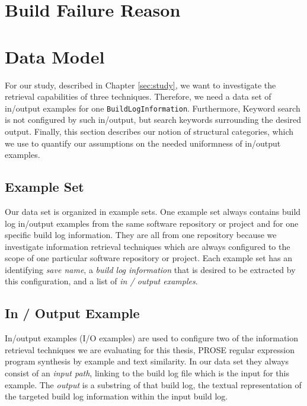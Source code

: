 \documentclass[\myrootdir/main.tex]{subfiles}
\begin{document}
\section{Build Failure Reason}


\section{Data Model}
For our study, described in Chapter \ref{sec:study}, we want to investigate the retrieval capabilities of three techniques. Therefore, we need a data set of in/output examples for one \texttt{BuildLogInformation}. Furthermore, Keyword search is not configured by such in/output, but search keywords surrounding the desired output. Finally, this section describes our notion of structural categories, which we use to quantify our assumptions on the needed uniformness of in/output examples.

\subsection{Example Set}
Our data set is organized in example sets. One example set always contains build log in/output examples from the same software repository or project and for one specific build log information. They are all from one repository because we investigate information retrieval techniques which are always configured to the scope of one particular software repository or project.
Each example set has an identifying \emph{save name}, a \emph{build log information} that is desired to be extracted by this configuration, and a list of \emph{in / output examples}.

\subsection{In / Output Example}
In/output examples (I/O examples) are used to configure two of the information retrieval techniques we are evaluating for this thesis, PROSE regular expression program synthesis by example and text similarity.
In our data set they always consist of an \emph{input path}, linking to the build log file which is the input for this example.
The \emph{output} is a substring of that build log, the textual representation of the targeted build log information within the input build log.
\end{document}
